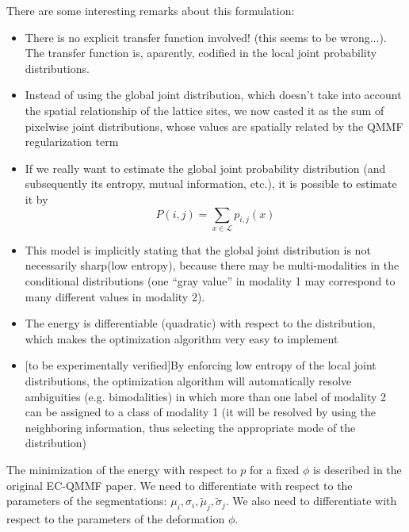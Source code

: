 \documentclass[11pt]{article}
\begin{document}
There are some interesting remarks about this formulation:
\begin{itemize}
	\item{There is no explicit transfer function involved! (this seems to be wrong...). The transfer function is, aparently, codified in the local joint probability distributions.}
	\item{Instead of using the global joint distribution, which doesn't take into account the spatial relationship of the lattice sites, we now casted it as the sum of pixelwise joint distributions, whose values are spatially related by the QMMF regularization term}
	\item{If we really want to estimate the global joint probability distribution (and subsequently its entropy, mutual information, etc.), it is possible to estimate it by
\begin{equation}
	P(i, j) = \sum_{x\in\mathcal{L}}p_{i,j}(x)
\end{equation}}
	\item{This model is implicitly stating that the global joint distribution is not necessarily sharp(low entropy), because there may be multi-modalities in the conditional distributions (one ``gray value'' in modality 1 may correspond to many different values in modality 2).}
	\item{The energy is differentiable (quadratic) with respect to the distribution, which makes the optimization algorithm very easy to implement}
	\item{[to be experimentally verified]By enforcing low entropy of the local joint distributions, the optimization algorithm will automatically resolve ambiguities (e.g. bimodalities) in which more than one label of modality 2 can be assigned to a class of modality 1 (it will be resolved by using the neighboring information, thus selecting the appropriate mode of the distribution)}
\end{itemize}

The minimization of the energy with respect to $p$ for a fixed $\phi$ is described in the original EC-QMMF paper. We need to differentiate with respect to the parameters of the segmentations: $\mu_{i}, \sigma_{i}, \tilde{\mu}_{j}, \tilde{\sigma}_j$. We also need to differentiate with respect to the parameters of the deformation $\phi$.
\end{document}
